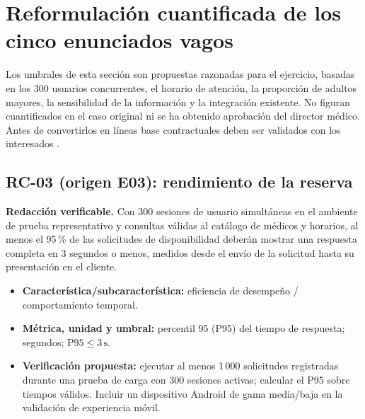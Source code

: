 \documentclass[11pt,a4paper]{article}
\begin{document}
\section{Reformulación cuantificada de los cinco enunciados vagos}
Los umbrales de esta sección son propuestas razonadas para el ejercicio, basadas en los 300 usuarios concurrentes, el horario de atención, la proporción de adultos mayores, la sensibilidad de la información y la integración existente. No figuran cuantificados en el caso original ni se ha obtenido aprobación del director médico. Antes de convertirlos en líneas base contractuales deben ser validados con los interesados \cite{guia2026,iso29148}.

\subsection*{RC-03 (origen E03): rendimiento de la reserva}
\textbf{Redacción verificable.} Con 300 sesiones de usuario simultáneas en el ambiente de prueba representativo y consultas válidas al catálogo de médicos y horarios, al menos el 95\,\% de las solicitudes de disponibilidad deberán mostrar una respuesta completa en 3 segundos o menos, medidos desde el envío de la solicitud hasta su presentación en el cliente.
\begin{itemize}
\item \textbf{Característica/subcaracterística:} eficiencia de desempeño / comportamiento temporal.
\item \textbf{Métrica, unidad y umbral:} percentil 95 (P95) del tiempo de respuesta; segundos; \(\mathrm{P95}\leq 3\,\mathrm{s}\).
\item \textbf{Verificación propuesta:} ejecutar al menos 1\,000 solicitudes registradas durante una prueba de carga con 300 sesiones activas; calcular el P95 sobre tiempos válidos. Incluir un dispositivo Android de gama media/baja en la validación de experiencia móvil.
\end{itemize}
\end{document}
